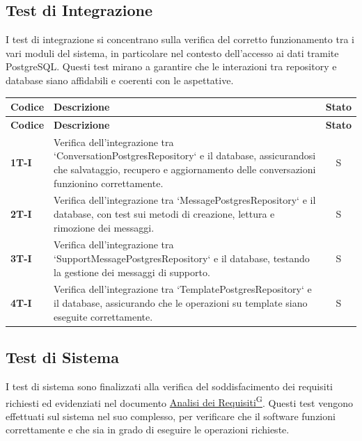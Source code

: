 \documentclass{article}
\begin{document}
\subsection{Test di Integrazione}
I test di integrazione si concentrano sulla verifica del corretto funzionamento tra i vari moduli del sistema, in particolare nel contesto dell'accesso ai dati tramite PostgreSQL. Questi test mirano a garantire che le interazioni tra repository e database siano affidabili e coerenti con le aspettative.

\begin{longtable}{|>{\centering\arraybackslash}m{}|>{\raggedright\arraybackslash}m{}|c|}
    \hline
    \textbf{Codice} & \textbf{Descrizione} & \textbf{Stato} \\
    \hline
    \endfirsthead
    \hline
    \textbf{Codice} & \textbf{Descrizione} & \textbf{Stato} \\
    \hline
    \endhead
    \hline
    \endfoot

    \textbf{1T-I} & Verifica dell’integrazione tra `ConversationPostgresRepository` e il database, assicurandosi che salvataggio, recupero e aggiornamento delle conversazioni funzionino correttamente. & S \\
    \hline
    \textbf{2T-I} & Verifica dell’integrazione tra `MessagePostgresRepository` e il database, con test sui metodi di creazione, lettura e rimozione dei messaggi. & S \\
    \hline
    \textbf{3T-I} & Verifica dell’integrazione tra `SupportMessagePostgresRepository` e il database, testando la gestione dei messaggi di supporto. & S \\
    \hline
    \textbf{4T-I} & Verifica dell’integrazione tra `TemplatePostgresRepository` e il database, assicurando che le operazioni su template siano eseguite correttamente. & S \\
    \hline
\end{longtable}


\subsection{Test di Sistema} %
I test di sistema sono finalizzati alla verifica del soddisfacimento dei requisiti richiesti ed evidenziati nel documento
\href{https://code7crusaders.github.io/docs/PB/documentazione_interna/glossario.html#analisi-dei-requisiti}{Analisi dei Requisiti\textsuperscript{G}}. Questi test vengono effettuati sul sistema nel suo complesso, per verificare che il software funzioni correttamente
e che sia in grado di eseguire le operazioni richieste.
\end{document}
